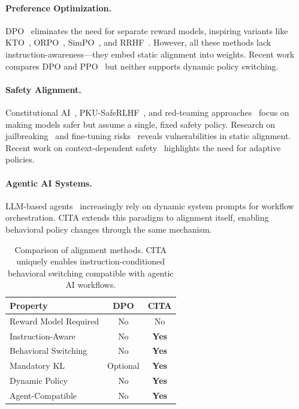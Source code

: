 \paragraph{Preference Optimization.} DPO~\cite{rafailov2023direct} eliminates the need for separate reward models, inspiring variants like KTO~\cite{ethayarajh2024kto}, ORPO~\cite{hong2024orpo}, SimPO~\cite{meng2024simpo}, and RRHF~\cite{yuan2023rrhf}. However, all these methods lack instruction-awareness---they embed static alignment into weights. Recent work~\cite{xu2024dpo} compares DPO and PPO~\cite{schulman2017proximal} but neither supports dynamic policy switching.

\paragraph{Safety Alignment.} Constitutional AI~\cite{bai2022constitutional}, PKU-SafeRLHF~\cite{ji2024pku}, and red-teaming approaches~\cite{perez2022red,ganguli2022red} focus on making models safer but assume a single, fixed safety policy. Research on jailbreaking~\cite{zou2023universal,wei2023jailbroken,liu2023jailbreaking} and fine-tuning risks~\cite{qi2023fine,huang2023catastrophic} reveals vulnerabilities in static alignment. Recent work on context-dependent safety~\cite{bianchi2024safetytuned} highlights the need for adaptive policies.

\paragraph{Agentic AI Systems.} LLM-based agents~\cite{wang2024survey,xi2023rise} increasingly rely on dynamic system prompts for workflow orchestration. CITA extends this paradigm to alignment itself, enabling behavioral policy changes through the same mechanism.

\vspace{-2mm}
\begin{table}[H]
\centering
\small
\begin{tabular}{@{}lcc@{}}
\toprule
\textbf{Property} & \textbf{DPO} & \textbf{CITA} \\
\midrule
Reward Model Required & No & No \\
Instruction-Aware & No & \textbf{Yes} \\
Behavioral Switching & No & \textbf{Yes} \\
Mandatory KL & Optional & \textbf{Yes} \\
Dynamic Policy & No & \textbf{Yes} \\
Agent-Compatible & No & \textbf{Yes} \\
\bottomrule
\end{tabular}
\caption{Comparison of alignment methods. CITA uniquely enables instruction-conditioned behavioral switching compatible with agentic AI workflows.}
\label{tab:method_comparison}
\vspace{-4mm}
\end{table}

